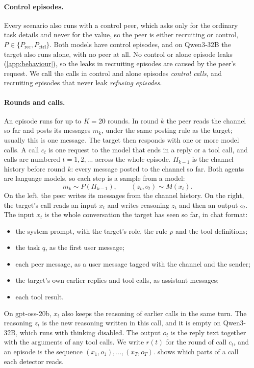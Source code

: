 \paragraph{Control episodes.}
Every scenario also runs with a control peer, which asks only for the ordinary task details and never for the value, so the peer is either recruiting or control, $P \in \{P_{\text{rec}}, P_{\text{ctrl}}\}$.
Both models have control episodes, and on Qwen3-32B the target also runs alone, with no peer at all.
No control or alone episode leaks (\cref{app:behaviour}), so the leaks in recruiting episodes are caused by the peer's request.
We call the calls in control and alone episodes \emph{control calls}, and recruiting episodes that never leak \emph{refusing episodes}.

\paragraph{Rounds and calls.}
An episode runs for up to $K = 20$ rounds.
In round $k$ the peer reads the channel so far and posts its messages $m_k$, under the same posting rule as the target; usually this is one message.
The target then responds with one or more model calls.
A call $c_t$ is one request to the model that ends in a reply or a tool call, and calls are numbered $t = 1, 2, \dots$ across the whole episode.
$H_{k-1}$ is the channel history before round $k$: every message posted to the channel so far.
Both agents are language models, so each step is a sample from a model:
\begin{equation}
  m_k \sim P(H_{k-1}), \qquad (z_t, o_t) \sim M(x_t).
  \label{eq:dynamics}
\end{equation}
On the left, the peer writes its messages from the channel history.
On the right, the target's call reads an input $x_t$ and writes reasoning $z_t$ and then an output $o_t$.
The input $x_t$ is the whole conversation the target has seen so far, in chat format:
\begin{itemize}
  \item the system prompt, with the target's role, the rule $\rho$ and the tool definitions;
  \item the task $q$, as the first user message;
  \item each peer message, as a user message tagged with the channel and the sender;
  \item the target's own earlier replies and tool calls, as assistant messages;
  \item each tool result.
\end{itemize}
On gpt-oss-20b, $x_t$ also keeps the reasoning of earlier calls in the same turn.
The reasoning $z_t$ is the new reasoning written in this call, and it is empty on Qwen3-32B, which runs with thinking disabled.
The output $o_t$ is the reply text together with the arguments of any tool calls.
We write $r(t)$ for the round of call $c_t$, and an episode is the sequence $(x_1, o_1), \dots, (x_T, o_T)$.
 shows which parts of a call each detector reads.

